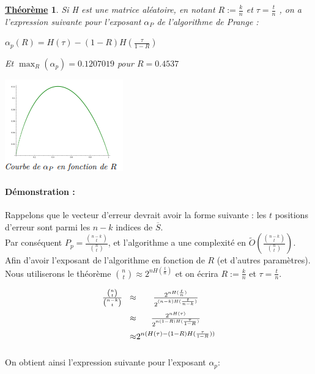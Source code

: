 \documentclass[12pt,openany]{report}
\newtheorem{theorem}{\underline{Théorème}}
\begin{document}
\begin{theorem} Si H est une matrice aléatoire, en notant $R := \frac{k}{n}$
et $\tau=\frac{t}{n}  $
, on a l’expression suivante pour l’exposant $\alpha_P$ de l’algorithme de Prange :
\begin{center}
\begin{boxedminipage}[ poslb ]{8cm}
{\Large
    $ \alpha_{p}(\mathit{R})=\mathit{H}(\tau)-(1-\mathit{R})\mathit{H}(\frac{\tau}{1-\mathit{R}})$}
\end{boxedminipage}
\end{center}
Et $\max_{R}(\alpha_{p})=0.1207019$ pour $ \mathit{R}=0.4537$

\end{theorem}


\begin{center}
\includegraphics[scale=2]{./courbe_prange}
\end{center}
\paragraph{Démonstration :} Rappelons que le vecteur d’erreur devrait avoir la forme suivante :
les $t$ positions d’erreur sont parmi les $n-k$ indices de $\overline{\mathit{S}}$.\\
Par conséquent $\mathit{P}_{p}= \frac{{{n-k} \choose t }}{{n \choose t }}$, et l'algorithme a une complexité en $ \tilde{O}\left( \frac{{{n-k} \choose t }}{{n \choose t }}   \right) $. Afin d'avoir l'exposant de l'algorithme en fonction de $\mathit{R}$ (et d'autres paramètres). Nous utiliserons le théorème  $ {n \choose t} \approx 2^{n\mathit{H}(\frac{t}{n})}$ et on écrira $\mathit{R}:= \frac{k}{n}  $ et $ \tau = \frac{t}{n} $.
 

\begin{center}
{\Large
\[
\left.
\begin{array}{c @{\hspace{0.3cm}\vspace{0.2cm}\approx} c}
\frac{{n\choose t}}{{{n-k}\choose t}}& \frac{2^{nH(\frac{t}{n})}}{2^{(n-k)H(\frac{t}{n-k})}} \\
& \frac{2^{nH(\tau)}}{2^{n(1-R)H(\frac{\tau}{1-R})}} \\
& 2^{n(H(\tau)-(1-R)H(\frac{\tau}{1-R}))}
\end{array}
\right.
\]
}
\end{center}
On obtient ainsi l'expression suivante pour l'exposant $\alpha_{p}$:
\end{document}
